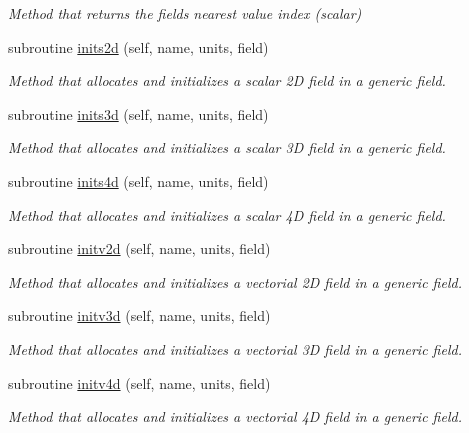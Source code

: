 \begin{DoxyCompactItemize}
\begin{DoxyCompactList}\small\item\em Method that returns the field\textquotesingle{}s nearest value index (scalar) \end{DoxyCompactList}\item 
subroutine \mbox{\hyperlink{namespacefieldtypes__mod_ad3329e97ec60bf9226d19be45ed21859}{inits2d}} (self, name, units, field)
\begin{DoxyCompactList}\small\item\em Method that allocates and initializes a scalar 2D field in a generic field. \end{DoxyCompactList}\item 
subroutine \mbox{\hyperlink{namespacefieldtypes__mod_a750ce2c729d98ea7031c839a3a5ebd7c}{inits3d}} (self, name, units, field)
\begin{DoxyCompactList}\small\item\em Method that allocates and initializes a scalar 3D field in a generic field. \end{DoxyCompactList}\item 
subroutine \mbox{\hyperlink{namespacefieldtypes__mod_a1987bd94293cfd9e35016ac5992501cd}{inits4d}} (self, name, units, field)
\begin{DoxyCompactList}\small\item\em Method that allocates and initializes a scalar 4D field in a generic field. \end{DoxyCompactList}\item 
subroutine \mbox{\hyperlink{namespacefieldtypes__mod_ad1af664e23793260f9c2fcd03829a1f5}{initv2d}} (self, name, units, field)
\begin{DoxyCompactList}\small\item\em Method that allocates and initializes a vectorial 2D field in a generic field. \end{DoxyCompactList}\item 
subroutine \mbox{\hyperlink{namespacefieldtypes__mod_aa0a152c9e5131d3003cc34e4f3b2974d}{initv3d}} (self, name, units, field)
\begin{DoxyCompactList}\small\item\em Method that allocates and initializes a vectorial 3D field in a generic field. \end{DoxyCompactList}\item 
subroutine \mbox{\hyperlink{namespacefieldtypes__mod_a08d665678bea0956a323d08863e164e5}{initv4d}} (self, name, units, field)
\begin{DoxyCompactList}\small\item\em Method that allocates and initializes a vectorial 4D field in a generic field. \end{DoxyCompactList}\item 

\end{DoxyCompactItemize}
